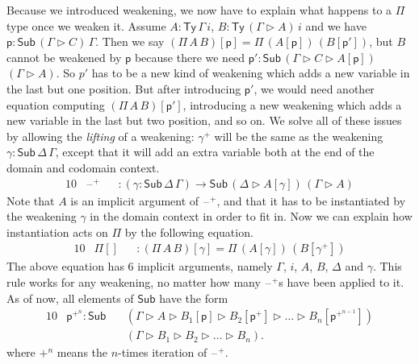 \documentclass[sigplan,10pt,anonymous,review]{acmart}\settopmatter{printfolios=true,printccs=false,printacmref=false}
\newcommand{\ra}{\rightarrow}
\newcommand{\Ty}{\mathsf{Ty}}
\newcommand{\Sub}{\mathsf{Sub}}
\newcommand{\p}{\mathsf{p}}
\newcommand{\ext}{\mathop{\triangleright}}
\newcommand{\blank}{\mathord{\hspace{1pt}\text{--}\hspace{1pt}}} %
\begin{document}
Because we introduced weakening, we now have to explain what happens
to a $\Pi$ type once we weaken it. Assume $A : \Ty\,\Gamma\,i$,
$B:\Ty\,(\Gamma\ext A)\,i$ and we have $\p:\Sub\,(\Gamma\ext
C)\,\Gamma$. Then we say $(\Pi\,A\,B)[\p] = \Pi\,(A[\p])\,(B[\p'])$,
but $B$ cannot be weakened by $\p$ because there we need $\p' :
\Sub\,(\Gamma\ext C\ext A[\p])$ $(\Gamma\ext A)$. So $p'$ has to be a %
new kind of weakening which adds a new variable in the last but one
position. But after introducing $\p'$, we would need another equation computing $(\Pi\,A\,B)[\p']$,
introducing a new weakening which adds a new variable in the last but
two position, and so on. We solve all of these issues by allowing the
\emph{lifting} of a weakening: $\gamma^+$ will be the same as the
weakening $\gamma : \Sub\,\Delta\,\Gamma$, except that it will add an
extra variable both at the end of the domain and codomain
context.
\begin{alignat*}{10}
& \blank^+ && : (\gamma:\Sub\,\Delta\,\Gamma)\ra\Sub\,(\Delta\ext A[\gamma])\,(\Gamma\ext A)
\end{alignat*}
Note that $A$ is an implicit argument of $\blank^+$, and that it has
to be instantiated by the weakening $\gamma$ in the domain context in
order to fit in. Now we can explain how instantiation acts on $\Pi$ by
the following equation.
\begin{alignat*}{10}
& \Pi[] && : (\Pi\,A\,B)[\gamma] = \Pi\,(A[\gamma])\,(B[\gamma^+])
\end{alignat*}
The above equation has 6 implicit arguments, namely $\Gamma$, $i$,
$A$, $B$, $\Delta$ and $\gamma$.  This rule works for any weakening,
no matter how many $\blank^+$s have been applied to it. As of now, all
elements of $\Sub$ have the form
\begin{alignat*}{10}
  & \p^{+^n} : \Sub\, && (\Gamma\ext A\ext B_1[\p]\ext B_2[\p^+]\ext\dots\ext B_n[\p^{+^{n-1}}]) \\
  & && (\Gamma\ext B_1\ext B_2\ext\dots\ext B_n).
\end{alignat*}
where $+^n$ means the $n$-times iteration of $\blank^+$.
\end{document}
